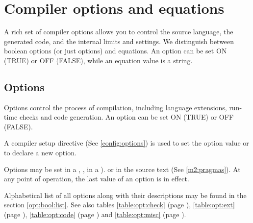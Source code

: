 

\newcommand{\MLBegin}{\ifonline {\bf Modes:} \else [\fi}
\newcommand{\MLEnd}{\ifonline \else ]\fi}
\newcommand{\ModeC}{\ifonline \ref[COMPILE]{xc:modes:compile}\else compile\fi}
\newcommand{\ModeM}{\ifonline \ref[MAKE]{xc:modes:make}\else make\fi}
\newcommand{\ModeP}{\ifonline \ref[PROJECT]{xc:modes:project}\else project\fi}
\newcommand{\ModeB}{\ifonline \ref[BROWSE]{xc:modes:browse}\else browse\fi}
\newcommand{\ModeG}{\ifonline \ref[GEN]{xc:modes:gen}\else gen\fi}

\chapter{Compiler options and equations}\label{options}

A rich set of \xds{} compiler options allows you to control the source language,
the generated code, and the internal limits and settings.  We distinguish
between boolean options (or just options) and equations. An option can
be set ON (TRUE) or OFF (FALSE), while an equation value is a string.

\section{Options}\label{opt:bool}

Options control the process of compilation, including  language
extensions, run-time checks and code generation. An option can be
set ON (TRUE) or OFF (FALSE).

A compiler setup directive (See \ref{config:options}) is used
to set the option value or to declare a new option.

Options may be set in a ,
, in a ).
or in the source text (See \ref{m2:pragmas}). At any
point of operation, the last value of an option is in effect.

Alphabetical list of all options along with their descriptions
may be found in the section \ref{opt:bool:list}.
\ifonline\else
See also tables
\ref{table:opt:check} (page \pageref{table:opt:check}),
\ref{table:opt:ext}   (page \pageref{table:opt:ext}),
\ref{table:opt:code}  (page \pageref{table:opt:code})
and
\ref{table:opt:misc}  (page \pageref{table:opt:misc}).
\fi

